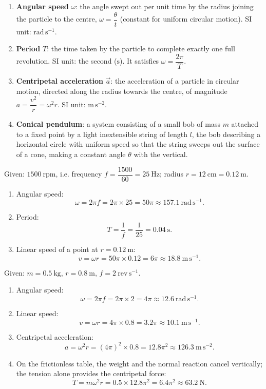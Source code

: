 \documentclass[11pt]{article}
\newcommand{\cle}[1]{{\popxbold\color{popdark}#1}}
\begin{document}
\begin{corrige}
\begin{enumerate}
\item \textbf{Angular speed} $\omega$: the angle swept out per unit time by the radius joining the particle to the centre, $\omega = \dfrac{\theta}{t}$ (constant for uniform circular motion). SI unit: $\mathrm{rad\,s^{-1}}$.
\item \textbf{Period} $T$: the time taken by the particle to complete exactly one full revolution. SI unit: the second ($\mathrm{s}$). It satisfies $\omega = \dfrac{2\pi}{T}$.
\item \textbf{Centripetal acceleration} $\vec{a}$: the acceleration of a particle in circular motion, directed along the radius towards the centre, of magnitude $a = \dfrac{v^{2}}{r} = \omega^{2}r$. SI unit: $\mathrm{m\,s^{-2}}$.
\item \textbf{Conical pendulum}: a system consisting of a small bob of mass $m$ attached to a fixed point by a light inextensible string of length $l$, the bob describing a horizontal circle with uniform speed so that the string sweeps out the surface of a cone, making a constant angle $\theta$ with the vertical.
\end{enumerate}
\end{corrige}

\begin{corrige}
Given: $1500\ \mathrm{rpm}$, i.e. frequency $f = \dfrac{1500}{60} = 25\ \mathrm{Hz}$; radius $r = 12\ \mathrm{cm} = 0.12\ \mathrm{m}$.
\begin{enumerate}
\item Angular speed:
\[ \omega = 2\pi f = 2\pi \times 25 = 50\pi \approx 157.1\ \mathrm{rad\,s^{-1}}. \]
\item Period:
\[ T = \frac{1}{f} = \frac{1}{25} = 0.04\ \mathrm{s}. \]
\item Linear speed of a point at $r = 0.12\ \mathrm{m}$:
\[ v = \omega r = 50\pi \times 0.12 = 6\pi \approx 18.8\ \mathrm{m\,s^{-1}}. \]
\end{enumerate}
\end{corrige}

\begin{corrige}
Given: $m = 0.5\ \mathrm{kg}$, $r = 0.8\ \mathrm{m}$, $f = 2\ \mathrm{rev\,s^{-1}}$.
\begin{enumerate}
\item Angular speed:
\[ \omega = 2\pi f = 2\pi \times 2 = 4\pi \approx 12.6\ \mathrm{rad\,s^{-1}}. \]
\item Linear speed:
\[ v = \omega r = 4\pi \times 0.8 = 3.2\pi \approx 10.1\ \mathrm{m\,s^{-1}}. \]
\item Centripetal acceleration:
\[ a = \omega^{2} r = (4\pi)^{2}\times 0.8 = 12.8\pi^{2} \approx 126.3\ \mathrm{m\,s^{-2}}. \]
\item On the frictionless table, the weight and the normal reaction cancel vertically; the \cle{tension} alone provides the centripetal force:
\[ T = m\omega^{2}r = 0.5 \times 12.8\pi^{2} = 6.4\pi^{2} \approx 63.2\ \mathrm{N}. \]
\end{enumerate}
\end{corrige}
\end{document}
